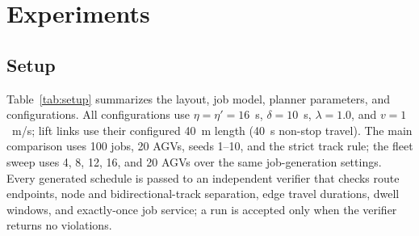 \section{Experiments}
\label{sec:experiments}

\subsection{Setup}
Table~\ref{tab:setup} summarizes the layout, job model, planner parameters, and configurations. All configurations use $\eta=\eta'=16$~s, $\delta=10$~s, $\lambda=1.0$, and $v=1$~m/s; lift links use their configured 40~m length (40~s non-stop travel). The main comparison uses 100 jobs, 20 AGVs, seeds 1--10, and the strict track rule; the fleet sweep uses 4, 8, 12, 16, and 20 AGVs over the same job-generation settings. Every generated schedule is passed to an independent verifier that checks route endpoints, node and bidirectional-track separation, edge travel durations, dwell windows, and exactly-once job service; a run is accepted only when the verifier returns no violations.

\begin{table}[t]
\centering
\small
\caption{Experimental setup (layout, job model, parameters, configurations).}
\label{tab:setup}
\end{table}

